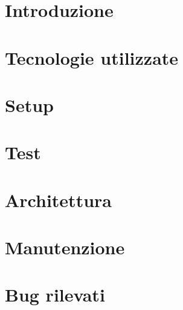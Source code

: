 \documentclass[]{article}
\begin{document}
	
	\newpage
	\tableofcontents
	\newpage
	\listoffigures
	\listoftables
	\newpage


	\section{Introduzione}
	
	\newpage

	\section{Tecnologie utilizzate}
	
	\newpage

	\section{Setup}
	
	\newpage

	\section{Test}
	
	\newpage

	\section{Architettura}
	
	\newpage

	\section{Manutenzione}
	
	\newpage
	
	\section{Bug rilevati}
	
	\newpage
	
	
	
\end{document}
